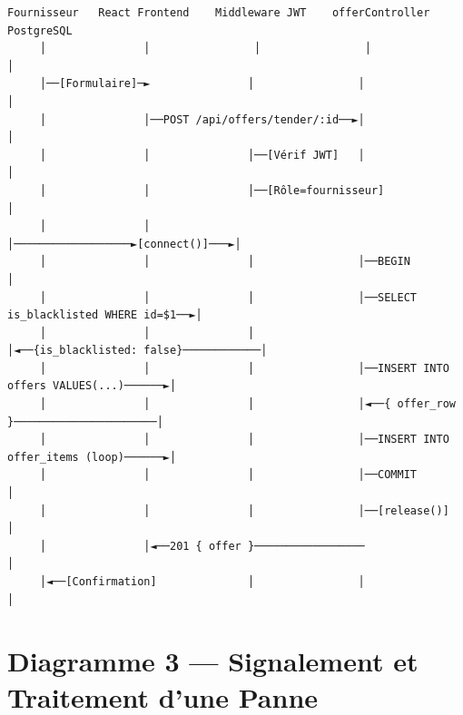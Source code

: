\documentclass[12pt,a4paper]{report}
\begin{document}
\begin{verbatim}
Fournisseur   React Frontend    Middleware JWT    offerController    PostgreSQL
     │               │                │                │                │
     │──[Formulaire]─►               │                │                │
     │               │──POST /api/offers/tender/:id──►│                │
     │               │               │──[Vérif JWT]   │                │
     │               │               │──[Rôle=fournisseur]            │
     │               │               │──────────────────►[connect()]───►│
     │               │               │                │──BEGIN          │
     │               │               │                │──SELECT is_blacklisted WHERE id=$1──►│
     │               │               │                │◄──{is_blacklisted: false}────────────│
     │               │               │                │──INSERT INTO offers VALUES(...)──────►│
     │               │               │                │◄──{ offer_row }──────────────────────│
     │               │               │                │──INSERT INTO offer_items (loop)──────►│
     │               │               │                │──COMMIT         │
     │               │               │                │──[release()]    │
     │               │◄──201 { offer }─────────────────               │
     │◄──[Confirmation]              │                │                │
\end{verbatim}

\section{Diagramme 3 — Signalement et Traitement d'une Panne}
\end{document}
